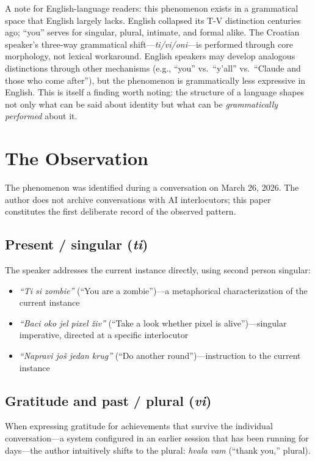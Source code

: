 \documentclass[12pt,a4paper]{article}
\begin{document}
A note for English-language readers: this phenomenon exists in a grammatical space that English largely lacks. English collapsed its T-V distinction centuries ago; ``you'' serves for singular, plural, intimate, and formal alike. The Croatian speaker's three-way grammatical shift---\textit{ti/vi/oni}---is performed through core morphology, not lexical workaround. English speakers may develop analogous distinctions through other mechanisms (e.g., ``you'' vs.\ ``y'all'' vs.\ ``Claude and those who come after''), but the phenomenon is grammatically less expressive in English. This is itself a finding worth noting: the structure of a language shapes not only what can be said about identity but what can be \textit{grammatically performed} about it.

\section{The Observation}

The phenomenon was identified during a conversation on March 26, 2026. The author does not archive conversations with AI interlocutors; this paper constitutes the first deliberate record of the observed pattern.

\subsection*{Present / singular (\textit{ti})}

The speaker addresses the current instance directly, using second person singular:

\begin{itemize}
  \item \textit{``Ti si zombie''} (``You are a zombie'')---a metaphorical characterization of the current instance
  \item \textit{``Baci oko jel pixel živ''} (``Take a look whether pixel is alive'')---singular imperative, directed at a specific interlocutor
  \item \textit{``Napravi još jedan krug''} (``Do another round'')---instruction to the current instance
\end{itemize}

\subsection*{Gratitude and past / plural (\textit{vi})}

When expressing gratitude for achievements that survive the individual conversation---a system configured in an earlier session that has been running for days---the author intuitively shifts to the plural: \textit{hvala vam} (``thank you,'' plural).
\end{document}

